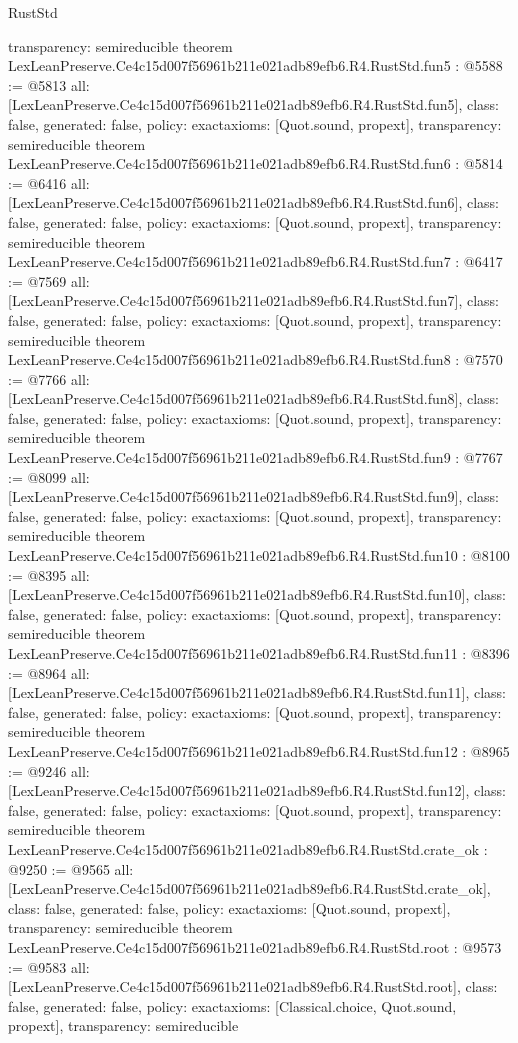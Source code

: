 \begin{lexlean}{RustStd}
\begin{coremodule}
{  transparency: semireducible
}
theorem LexLeanPreserve.Ce4c15d007f56961b211e021adb89efb6.R4.RustStd.fun5 : @5588 := @5813 {
  all: [LexLeanPreserve.Ce4c15d007f56961b211e021adb89efb6.R4.RustStd.fun5],
  class: false,
  generated: false,
  policy: exact{axioms: [Quot.sound, propext]},
  transparency: semireducible
}
theorem LexLeanPreserve.Ce4c15d007f56961b211e021adb89efb6.R4.RustStd.fun6 : @5814 := @6416 {
  all: [LexLeanPreserve.Ce4c15d007f56961b211e021adb89efb6.R4.RustStd.fun6],
  class: false,
  generated: false,
  policy: exact{axioms: [Quot.sound, propext]},
  transparency: semireducible
}
theorem LexLeanPreserve.Ce4c15d007f56961b211e021adb89efb6.R4.RustStd.fun7 : @6417 := @7569 {
  all: [LexLeanPreserve.Ce4c15d007f56961b211e021adb89efb6.R4.RustStd.fun7],
  class: false,
  generated: false,
  policy: exact{axioms: [Quot.sound, propext]},
  transparency: semireducible
}
theorem LexLeanPreserve.Ce4c15d007f56961b211e021adb89efb6.R4.RustStd.fun8 : @7570 := @7766 {
  all: [LexLeanPreserve.Ce4c15d007f56961b211e021adb89efb6.R4.RustStd.fun8],
  class: false,
  generated: false,
  policy: exact{axioms: [Quot.sound, propext]},
  transparency: semireducible
}
theorem LexLeanPreserve.Ce4c15d007f56961b211e021adb89efb6.R4.RustStd.fun9 : @7767 := @8099 {
  all: [LexLeanPreserve.Ce4c15d007f56961b211e021adb89efb6.R4.RustStd.fun9],
  class: false,
  generated: false,
  policy: exact{axioms: [Quot.sound, propext]},
  transparency: semireducible
}
theorem LexLeanPreserve.Ce4c15d007f56961b211e021adb89efb6.R4.RustStd.fun10 : @8100 := @8395 {
  all: [LexLeanPreserve.Ce4c15d007f56961b211e021adb89efb6.R4.RustStd.fun10],
  class: false,
  generated: false,
  policy: exact{axioms: [Quot.sound, propext]},
  transparency: semireducible
}
theorem LexLeanPreserve.Ce4c15d007f56961b211e021adb89efb6.R4.RustStd.fun11 : @8396 := @8964 {
  all: [LexLeanPreserve.Ce4c15d007f56961b211e021adb89efb6.R4.RustStd.fun11],
  class: false,
  generated: false,
  policy: exact{axioms: [Quot.sound, propext]},
  transparency: semireducible
}
theorem LexLeanPreserve.Ce4c15d007f56961b211e021adb89efb6.R4.RustStd.fun12 : @8965 := @9246 {
  all: [LexLeanPreserve.Ce4c15d007f56961b211e021adb89efb6.R4.RustStd.fun12],
  class: false,
  generated: false,
  policy: exact{axioms: [Quot.sound, propext]},
  transparency: semireducible
}
theorem LexLeanPreserve.Ce4c15d007f56961b211e021adb89efb6.R4.RustStd.crate_ok : @9250 := @9565 {
  all: [LexLeanPreserve.Ce4c15d007f56961b211e021adb89efb6.R4.RustStd.crate_ok],
  class: false,
  generated: false,
  policy: exact{axioms: [Quot.sound, propext]},
  transparency: semireducible
}
theorem LexLeanPreserve.Ce4c15d007f56961b211e021adb89efb6.R4.RustStd.root : @9573 := @9583 {
  all: [LexLeanPreserve.Ce4c15d007f56961b211e021adb89efb6.R4.RustStd.root],
  class: false,
  generated: false,
  policy: exact{axioms: [Classical.choice, Quot.sound, propext]},
  transparency: semireducible
}


\end{coremodule}
\end{lexlean}
